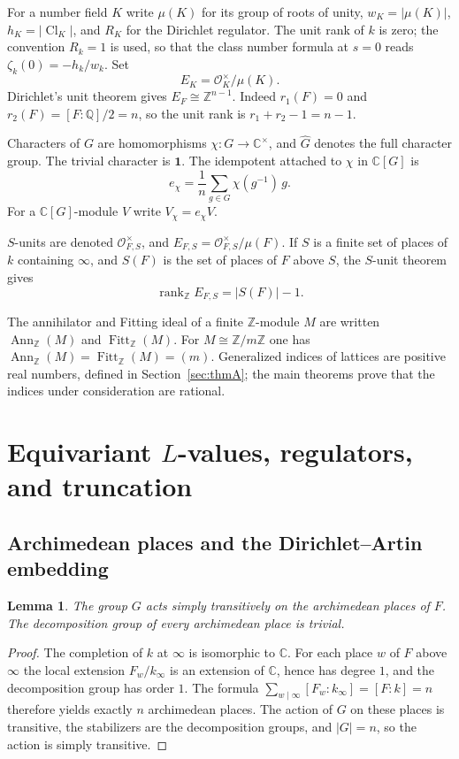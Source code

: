 \documentclass[11pt]{article}
\theoremstyle{plain}
\newtheorem{lemma}[theorem]{Lemma}
\theoremstyle{definition}
\theoremstyle{remark}
\newcommand{\Z}{\mathbb{Z}}
\newcommand{\Q}{\mathbb{Q}}
\newcommand{\C}{\mathbb{C}}
\newcommand{\OK}{\mathcal{O}}
\newcommand{\Cl}{\operatorname{Cl}}
\newcommand{\Ann}{\operatorname{Ann}}
\newcommand{\Fitt}{\operatorname{Fitt}}
\newcommand{\rk}{\operatorname{rank}}
\newcommand{\triv}{\mathbf{1}}
\begin{document}
For a number field $K$ write $\mu(K)$ for its group of roots of unity, $w_K=|\mu(K)|$, $h_K=|\Cl_K|$, and $R_K$ for the Dirichlet regulator.
The unit rank of $k$ is zero; the convention $R_k=1$ is used, so that the class number formula at $s=0$ reads $\zeta_k(0)=-h_k/w_k$.
Set
\[
  E_K=\OK_K^\times\big/\mu(K).
\]
Dirichlet's unit theorem gives $E_F\cong\Z^{n-1}$.
Indeed $r_1(F)=0$ and $r_2(F)=[F:\Q]/2=n$, so the unit rank is $r_1+r_2-1=n-1$.

Characters of $G$ are homomorphisms $\chi:G\to\C^{\times}$, and $\widehat G$ denotes the full character group.
The trivial character is $\triv$.
The idempotent attached to $\chi$ in $\C[G]$ is
\[
  e_{\chi}=\frac{1}{n}\sum_{g\in G}\chi(g^{-1})\,g.
\]
For a $\C[G]$-module $V$ write $V_{\chi}=e_{\chi}V$.

$S$-units are denoted $\OK_{F,S}^{\times}$, and $E_{F,S}=\OK_{F,S}^{\times}/\mu(F)$.
If $S$ is a finite set of places of $k$ containing $\infty$, and $S(F)$ is the set of places of $F$ above $S$, the $S$-unit theorem gives
\[
  \rk_{\Z}E_{F,S}=|S(F)|-1.
\]

The annihilator and Fitting ideal of a finite $\Z$-module $M$ are written $\Ann_{\Z}(M)$ and $\Fitt_{\Z}(M)$.
For $M\cong\Z/m\Z$ one has $\Ann_{\Z}(M)=\Fitt_{\Z}(M)=(m)$.
Generalized indices of lattices are positive real numbers, defined in Section~\ref{sec:thmA}; the main theorems prove that the indices under consideration are rational.

\section{Equivariant \texorpdfstring{$L$}{L}-values, regulators, and truncation}
\label{sec:prelim}

\subsection{Archimedean places and the Dirichlet--Artin embedding}

\begin{lemma}
\label{lem:transitive}
The group $G$ acts simply transitively on the archimedean places of $F$.
The decomposition group of every archimedean place is trivial.
\end{lemma}

\begin{proof}
The completion of $k$ at $\infty$ is isomorphic to $\C$.
For each place $w$ of $F$ above $\infty$ the local extension $F_w/k_{\infty}$ is an extension of $\C$, hence has degree $1$, and the decomposition group has order $1$.
The formula $\sum_{w\mid\infty}[F_w:k_{\infty}]=[F:k]=n$ therefore yields exactly $n$ archimedean places.
The action of $G$ on these places is transitive, the stabilizers are the decomposition groups, and $|G|=n$, so the action is simply transitive.
\end{proof}
\end{document}
